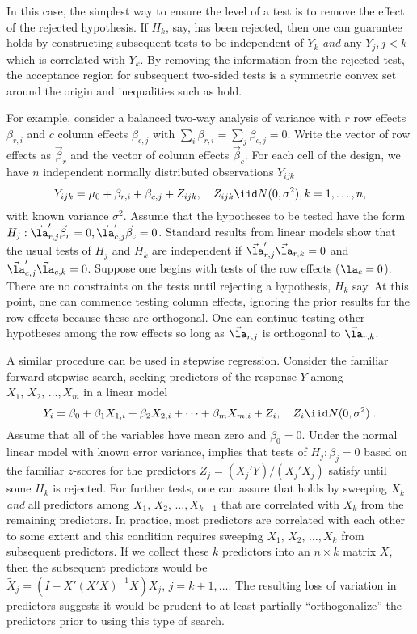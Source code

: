 \documentclass[12pt]{article}
\begin{document}
In this case, the simplest way to ensure the level of a test
is to remove the effect of the rejected hypothesis.  If $H_k$, say,
has been rejected, then one can guarantee  holds by
constructing subsequent tests to be independent of $Y_k$ {\em and} any
$Y_j, j<k$ which is correlated with $Y_k$.  By removing the
information from the rejected test, the acceptance region for
subsequent two-sided tests is a symmetric convex set around the origin and
inequalities such as  hold.


For example, consider a balanced two-way analysis of variance with $r$
row effects $\beta_{r,i}$ and $c$ column effects $\beta_{c,j}$ with
$\sum_i \beta_{r,i} = \sum_j \beta_{c,j} = 0$.  Write the vector of row
effects as $\vec\beta_r$ and the vector of column effects
$\vec\beta_c$.  For each cell of the design, we have $n$ independent
normally distributed observations $Y_{ijk}$
\begin{displaymath}
  Y_{ijk} = \mu_0 + \beta_{r,i} + \beta_{c,j} + Z_{ijk}, 
         \quad Z_{ijk} \iid N(0,\sigma^2), k=1,\ldots,n,
\end{displaymath}
with known variance $\sigma^2$.  Assume that the hypotheses to be
tested have the form $H_j: \vec\la_{r,j}' \vec\beta_r = 0,
\vec\la_{c,j}' \vec\beta_c = 0$.  Standard results from linear models
show that the usual tests of $H_j$ and $H_k$ are independent if
$\vec\la_{r,j}' \vec\la_{r,k} = 0$ and $\vec\la_{c,j}' \vec\la_{c,k}=0$.
Suppose one begins with tests of the row effects ($\la_c=0$).  There are no
constraints on the tests until rejecting a hypothesis, $H_k$ say.  At
this point, one can commence testing column effects, ignoring the
prior results for the row effects because these are orthogonal.  One
can continue testing other hypotheses among the row effects so long as
$\vec\la_{r,j}$ is orthogonal to $\vec\la_{r,k}$.


A similar procedure can be used in stepwise regression.  Consider the
familiar forward stepwise search, seeking predictors of the response
$Y$ among $X_1,\, X_2,\, \ldots, X_m$ in a linear model
\begin{displaymath}
  Y_i = \beta_0 + \beta_1 X_{1,i} + \beta_2 X_{2,i} + \cdots + \beta_m X_{m,i}
      + Z_{i},    \quad Z_{i} \iid N(0,\sigma^2) \;.
\end{displaymath}
Assume that all of the variables have mean zero and $\beta_0=0$.
Under the normal linear model with known error variance, 
implies that tests of $H_j: \beta_j = 0$ based on the familiar
$z$-scores for the predictors $Z_j = (X_j'Y)/(X_j'X_j)$ satisfy
 until some $H_k$ is rejected.  For further tests, one
can assure that  holds by sweeping $X_k$ {\em and} all
predictors among $X_1,\, X_2,\, \ldots, X_{k-1}$ that are correlated
with $X_k$ from the remaining predictors.  In practice, most
predictors are correlated with each other to some extent and this
condition requires sweeping $X_1,\, X_2,\, \ldots, X_k$ from
subsequent predictors.  If we collect these $k$ predictors into an $n
\times k$ matrix $X$, then the subsequent predictors would be
$\tilde{X}_j = (I-X'(X'X)^{-1}X)X_j,\, j = k+1,\ldots$.  The resulting
loss of variation in predictors suggests it would be prudent to at
least partially ``orthogonalize'' the predictors prior to using this
type of search.
\end{document}
